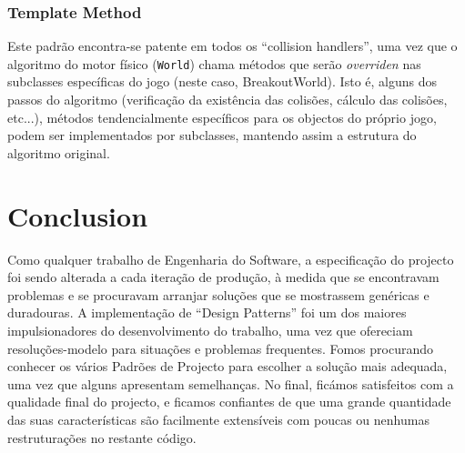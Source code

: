 \documentclass[a4paper]{article}
\begin{document}
\subsubsection{Template Method}
\noindent Este padrão encontra-se patente em todos os ``collision handlers'', uma vez que o algoritmo do motor físico (\texttt{World}) chama métodos que serão \textit{overriden} nas subclasses específicas do jogo (neste caso, BreakoutWorld). Isto é, alguns dos passos do algoritmo (verificação da existência das colisões, cálculo das colisões, etc...), métodos tendencialmente específicos para os objectos do próprio jogo, podem ser implementados por subclasses, mantendo assim a estrutura do algoritmo original.


\section{Conclusion}
\noindent Como qualquer trabalho de Engenharia do Software, a especificação do projecto foi sendo alterada a cada iteração de produção, à medida que se encontravam problemas e se procuravam arranjar soluções que se mostrassem genéricas e duradouras. A implementação de ``Design Patterns'' foi um dos maiores impulsionadores do desenvolvimento do trabalho, uma vez que ofereciam resoluções-modelo para situações e problemas frequentes. Fomos procurando conhecer os vários Padrões de Projecto para escolher a solução mais adequada, uma vez que alguns apresentam semelhanças. No final, ficámos satisfeitos com a qualidade final do projecto, e ficamos confiantes de que uma grande quantidade das suas características são facilmente extensíveis com poucas ou nenhumas restruturações no restante código.
\end{document}
